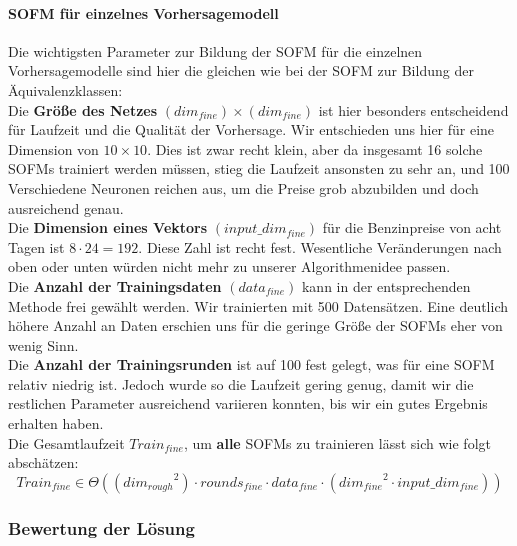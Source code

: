\documentclass[11pt]{article}
\begin{document}
	\paragraph{SOFM für einzelnes Vorhersagemodell\\}
	Die wichtigsten Parameter zur Bildung der SOFM für die einzelnen Vorhersagemodelle sind hier die gleichen wie bei der SOFM zur Bildung der Äquivalenzklassen:\\
	Die \textbf{Größe des Netzes} $(dim_{fine}) \times (dim_{fine})$ ist hier besonders entscheidend für Laufzeit und die Qualität der Vorhersage. Wir entschieden uns hier für eine Dimension von $10 \times 10$. Dies ist zwar recht klein, aber da insgesamt 16 solche SOFMs trainiert werden müssen, stieg die Laufzeit ansonsten zu sehr an, und 100 Verschiedene Neuronen reichen aus, um die Preise grob abzubilden und doch ausreichend genau.\\
	Die \textbf{Dimension eines Vektors} $(input\_dim_{fine})$ für die Benzinpreise von acht Tagen  ist  $8 \cdot 24 = 192$. Diese Zahl ist recht fest. Wesentliche Veränderungen nach oben oder unten würden nicht mehr zu unserer Algorithmenidee passen.\\
	Die \textbf{Anzahl der Trainingsdaten} $(data_{fine})$ kann in der entsprechenden Methode frei gewählt werden. Wir trainierten mit 500 Datensätzen. Eine deutlich höhere Anzahl an Daten erschien uns für die geringe Größe der SOFMs eher von wenig Sinn.\\
	Die \textbf{Anzahl der Trainingsrunden} ist auf 100 fest gelegt, was für eine SOFM relativ niedrig ist. Jedoch wurde so die Laufzeit gering genug, damit wir die restlichen Parameter ausreichend variieren konnten, bis wir ein gutes Ergebnis erhalten haben.\\
	Die Gesamtlaufzeit $Train_{fine}$, um \textbf{alle} SOFMs zu trainieren lässt sich wie folgt abschätzen:
		\[ Train_{fine} \in \Theta \left(\left({dim_{rough}}^2\right)\cdot rounds_{fine} \cdot data_{fine} \cdot \left( {dim_{fine}}^2 \cdot input\_dim_{fine} \right) \right) \]
	
	
\subsubsection{Bewertung der Lösung}
\end{document}
